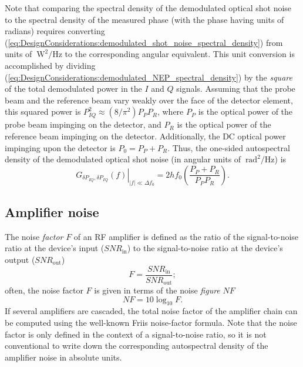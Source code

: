 Note that comparing the spectral density
of the demodulated optical shot noise
to the spectral density of the measured phase
(with the phase having units of radians)
requires converting
(\ref{eq:DesignConsiderations:demodulated_shot_noise_spectral_density})
from units of $\SI{}{\watt\squared\per\Hz}$
to the corresponding angular equivalent.
This unit conversion is accomplished by dividing
(\ref{eq:DesignConsiderations:demodulated_NEP_spectral_density})
by the \emph{square} of the total demodulated power in the $I$ and $Q$ signals.
Assuming that the probe beam and the reference beam
vary weakly over the face of the detector element,
this squared power is
$P_{IQ}^2 \approx (8 / \pi^2) P_P P_R$, where
$P_P$ is the optical power of the probe beam impinging on the detector, and
$P_R$ is the optical power of the reference beam impinging on the detector.
Additionally, the DC optical power impinging upon the detector is
$P_0 = P_P + P_R$.
Thus, the one-sided autospectral density
of the demodulated optical shot noise
(in angular units of $\SI{}{\radian\squared\per\Hz}$) is
\begin{equation}
  \left.
    G_{\delta P_{IQ}, \delta P_{IQ}}(f)
  \right|_{|f| \ll \Delta f_0}
  =
  2 h f_0 \left( \frac{P_P + P_R}{P_P P_R} \right).
\end{equation}


\subsection{Amplifier noise}
\label{sec:DesignConsiderations:amplitude_noise:amplifier}
The noise \emph{factor} $F$ of an RF amplifier is defined as the ratio of
the signal-to-noise ratio at the device's input ($SNR_{\text{in}}$) to
the signal-to-noise ratio at the device's output ($SNR_{\text{out}}$)
\begin{equation}
  F = \frac{SNR_{\text{in}}}{SNR_{\text{out}}};
\end{equation}
often, the noise factor $F$ is given
in terms of the noise \emph{figure} $NF$
\cite{minicircuits_amplifier_terms_defined}
\begin{equation}
  NF = 10 \log_{10} F.
\end{equation}
If several amplifiers are cascaded,
the total noise factor of the amplifier chain
can be computed using the well-known Friis noise-factor formula.
Note that the noise factor is only defined
in the context of a signal-to-noise ratio, so
it is not conventional to write down the corresponding
autospectral density of the amplifier noise in absolute units.


